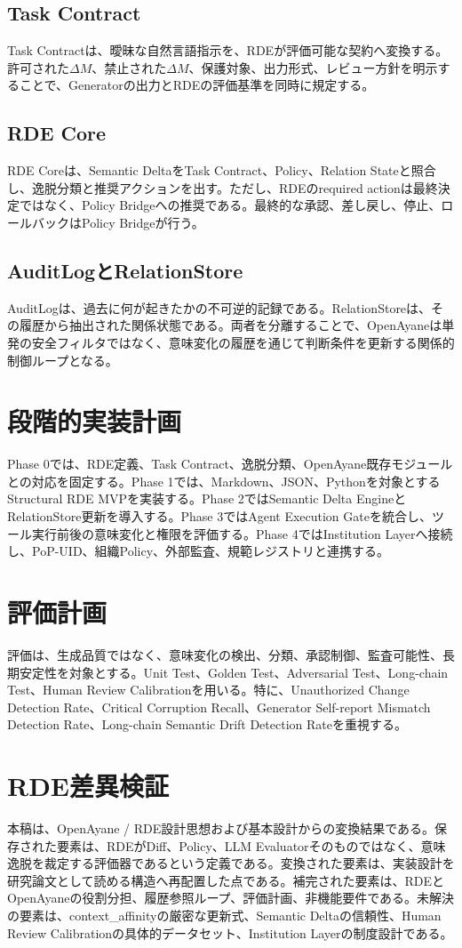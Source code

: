 \documentclass[11pt,a4paper]{article}
\begin{document}
\subsection{Task Contract}
Task Contractは、曖昧な自然言語指示を、RDEが評価可能な契約へ変換する。許可された$\Delta M$、禁止された$\Delta M$、保護対象、出力形式、レビュー方針を明示することで、Generatorの出力とRDEの評価基準を同時に規定する。

\subsection{RDE Core}
RDE Coreは、Semantic DeltaをTask Contract、Policy、Relation Stateと照合し、逸脱分類と推奨アクションを出す。ただし、RDEのrequired actionは最終決定ではなく、Policy Bridgeへの推奨である。最終的な承認、差し戻し、停止、ロールバックはPolicy Bridgeが行う。

\subsection{AuditLogとRelationStore}
AuditLogは、過去に何が起きたかの不可逆的記録である。RelationStoreは、その履歴から抽出された関係状態である。両者を分離することで、OpenAyaneは単発の安全フィルタではなく、意味変化の履歴を通じて判断条件を更新する関係的制御ループとなる。

\section{段階的実装計画}
Phase 0では、RDE定義、Task Contract、逸脱分類、OpenAyane既存モジュールとの対応を固定する。Phase 1では、Markdown、JSON、Pythonを対象とするStructural RDE MVPを実装する。Phase 2ではSemantic Delta EngineとRelationStore更新を導入する。Phase 3ではAgent Execution Gateを統合し、ツール実行前後の意味変化と権限を評価する。Phase 4ではInstitution Layerへ接続し、PoP-UID、組織Policy、外部監査、規範レジストリと連携する。

\section{評価計画}
評価は、生成品質ではなく、意味変化の検出、分類、承認制御、監査可能性、長期安定性を対象とする。Unit Test、Golden Test、Adversarial Test、Long-chain Test、Human Review Calibrationを用いる。特に、Unauthorized Change Detection Rate、Critical Corruption Recall、Generator Self-report Mismatch Detection Rate、Long-chain Semantic Drift Detection Rateを重視する。

\section{RDE差異検証}
本稿は、OpenAyane / RDE設計思想および基本設計からの変換結果である。保存された要素は、RDEがDiff、Policy、LLM Evaluatorそのものではなく、意味逸脱を裁定する評価器であるという定義である。変換された要素は、実装設計を研究論文として読める構造へ再配置した点である。補完された要素は、RDEとOpenAyaneの役割分担、履歴参照ループ、評価計画、非機能要件である。未解決の要素は、context\_affinityの厳密な更新式、Semantic Deltaの信頼性、Human Review Calibrationの具体的データセット、Institution Layerの制度設計である。
\end{document}
